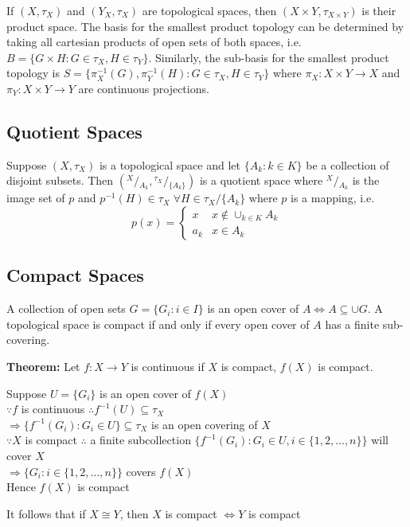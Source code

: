 \documentclass{article}
\begin{document}
If $(X, \tau_X)$ and $(Y_X, \tau_X)$ are topological spaces, then $(X \times Y, \tau_{X \times Y})$ is their product space. The basis for the smallest product topology can be determined by taking all cartesian products of open sets of both spaces, i.e. $B = \{G \times H: G \in \tau_X, H \in \tau_Y\}$. Similarly, the sub-basis for the smallest product topology is $S = \{\pi_X^{-1}(G), \pi_Y^{-1}(H): G \in \tau_X, H \in \tau_Y\}$ where $\pi_X: X \times Y \rightarrow X$ and $\pi_Y: X \times Y \rightarrow Y$ are continuous projections.

\subsection{Quotient Spaces}

Suppose $(X, \tau_X)$ is a topological space and let $\{A_k:k \in K\}$ be a collection of disjoint subsets. Then $(\phantom{}^X / \phantom{}_{A_k}, \phantom{}^{\tau_X} / \phantom{}_{\{A_k\}})$ is a quotient space where $\phantom{}^X / \phantom{}_{A_k}$ is the image set of $p$ and $p^{-1}(H) \in \tau_X \; \forall H \in \tau_X / \{A_k\}$ where $p$ is a mapping, i.e.
$$p(x) = \begin{cases} x & x \not\in \cup_{k \in K} A_k \\ a_k & x \in A_k\end{cases}$$

\subsection{Compact Spaces}

A collection of open sets $G = \{G_i: i \in I\}$ is an open cover of $A \iff A \subseteq \cup G$. A topological space is compact if and only if every open cover of $A$ has a finite sub-covering.

\textbf{Theorem:} Let $f: X \rightarrow Y$ is continuous if $X$ is compact, $f(X)$ is compact.
\begin{tcolorbox}[colback=lightgray!10,colframe=lightgray!10, fontupper=\linespread{1.5}\selectfont]
	Suppose $U = \{G_i\}$ is an open cover of $f(X)$ \\
	$\because f$ is continuous $\therefore f^{-1}(U) \subseteq \tau_X$ \\
	$\Rightarrow \{f^{-1}(G_i): G_i \in U\} \subseteq \tau_X$ is an open covering of $X$ \\
	$\because X$ is compact $\therefore$ a finite subcollection $\{f^{-1}(G_i): G_i \in U, i \in \{1,2,\dots,n\}\}$ will cover $X$ \\
	$\Rightarrow \{G_i: i \in \{1,2,\dots,n\}\}$ covers $f(X)$ \\
	Hence $f(X)$ is compact
\end{tcolorbox}
It follows that if $X \cong Y$, then $X$ is compact $\iff Y$ is compact
\end{document}
